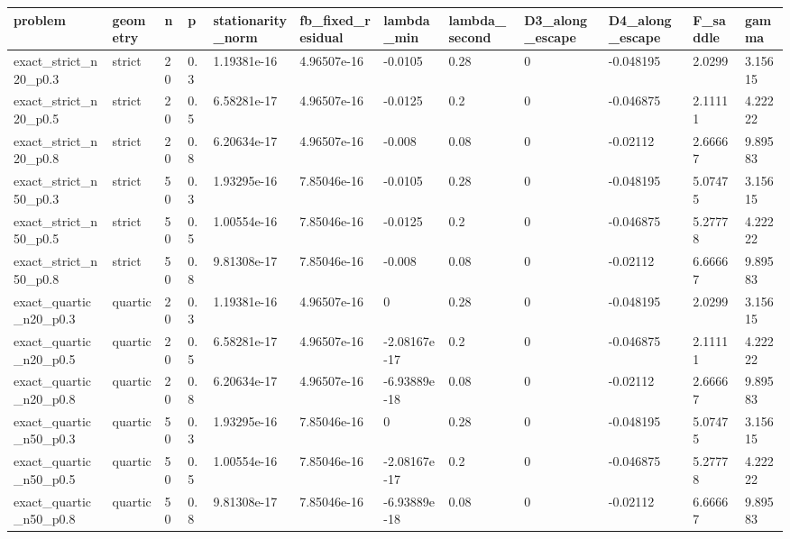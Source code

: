\begin{tabular}{llllllllllll}
\toprule
problem & geometry & n & p & stationarity\_norm & fb\_fixed\_residual & lambda\_min & lambda\_second & D3\_along\_escape & D4\_along\_escape & F\_saddle & gamma \\
\midrule
exact\_strict\_n20\_p0.3 & strict & 20 & 0.3 & 1.19381e-16 & 4.96507e-16 & -0.0105 & 0.28 & 0 & -0.048195 & 2.0299 & 3.15615 \\
exact\_strict\_n20\_p0.5 & strict & 20 & 0.5 & 6.58281e-17 & 4.96507e-16 & -0.0125 & 0.2 & 0 & -0.046875 & 2.11111 & 4.22222 \\
exact\_strict\_n20\_p0.8 & strict & 20 & 0.8 & 6.20634e-17 & 4.96507e-16 & -0.008 & 0.08 & 0 & -0.02112 & 2.66667 & 9.89583 \\
exact\_strict\_n50\_p0.3 & strict & 50 & 0.3 & 1.93295e-16 & 7.85046e-16 & -0.0105 & 0.28 & 0 & -0.048195 & 5.07475 & 3.15615 \\
exact\_strict\_n50\_p0.5 & strict & 50 & 0.5 & 1.00554e-16 & 7.85046e-16 & -0.0125 & 0.2 & 0 & -0.046875 & 5.27778 & 4.22222 \\
exact\_strict\_n50\_p0.8 & strict & 50 & 0.8 & 9.81308e-17 & 7.85046e-16 & -0.008 & 0.08 & 0 & -0.02112 & 6.66667 & 9.89583 \\
exact\_quartic\_n20\_p0.3 & quartic & 20 & 0.3 & 1.19381e-16 & 4.96507e-16 & 0 & 0.28 & 0 & -0.048195 & 2.0299 & 3.15615 \\
exact\_quartic\_n20\_p0.5 & quartic & 20 & 0.5 & 6.58281e-17 & 4.96507e-16 & -2.08167e-17 & 0.2 & 0 & -0.046875 & 2.11111 & 4.22222 \\
exact\_quartic\_n20\_p0.8 & quartic & 20 & 0.8 & 6.20634e-17 & 4.96507e-16 & -6.93889e-18 & 0.08 & 0 & -0.02112 & 2.66667 & 9.89583 \\
exact\_quartic\_n50\_p0.3 & quartic & 50 & 0.3 & 1.93295e-16 & 7.85046e-16 & 0 & 0.28 & 0 & -0.048195 & 5.07475 & 3.15615 \\
exact\_quartic\_n50\_p0.5 & quartic & 50 & 0.5 & 1.00554e-16 & 7.85046e-16 & -2.08167e-17 & 0.2 & 0 & -0.046875 & 5.27778 & 4.22222 \\
exact\_quartic\_n50\_p0.8 & quartic & 50 & 0.8 & 9.81308e-17 & 7.85046e-16 & -6.93889e-18 & 0.08 & 0 & -0.02112 & 6.66667 & 9.89583 \\
\bottomrule
\end{tabular}
